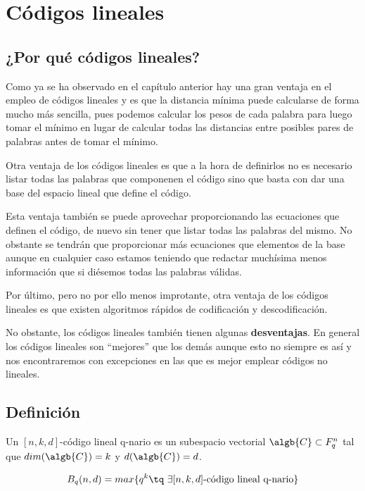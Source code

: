 \chapter{Códigos lineales}
\section{¿Por qué códigos lineales?}
Como ya se ha observado en el capítulo anterior hay una gran ventaja en el empleo de códigos lineales y es que la distancia mínima puede calcularse de forma mucho más sencilla, pues podemos calcular los pesos de cada palabra para luego tomar el mínimo en lugar de calcular todas las distancias entre posibles pares de palabras antes de tomar el mínimo.

Otra ventaja de los códigos lineales es que a la hora de definirlos no es necesario listar todas las palabras que componenen el código sino que basta con dar una base del espacio lineal que define el código.

Esta ventaja también se puede aprovechar proporcionando las ecuaciones que definen el código, de nuevo sin tener que listar todas las palabras del mismo. No obstante se tendrán que proporcionar más ecuaciones que elementos de la base aunque en cualquier caso estamos teniendo que redactar muchísima menos información que si diésemos todas las palabras válidas.

Por último, pero no por ello menos improtante, otra ventaja de los códigos lineales es que existen algoritmos rápidos de codificación y descodificación.

No obstante, los códigos lineales también tienen algunas \textbf{desventajas}. En general los códigos lineales son ``mejores'' que los demás aunque esto no siempre es así y nos encontraremos con excepciones en las que es mejor emplear códigos no lineales.

\section{Definición}

\begin{defn}
Un $[n,k,d]$-código lineal q-nario es un subespacio vectorial $\algb{C} \subset F_q^n$ tal que $dim(\algb{C})=k$ y $d(\algb{C})=d$.
\end{defn}

\begin{defn}[B$_q(n,d)$]
\[B_q(n,d)=max \{q^k \tq \ \exists [n,k,d]\text{-código lineal q-nario}\}\]
\end{defn}

